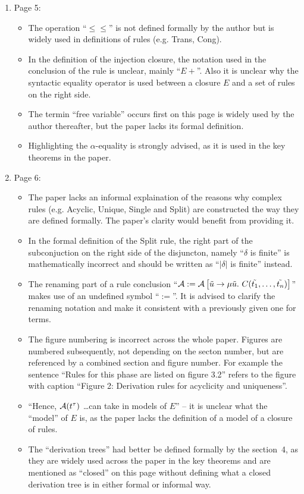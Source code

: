 \begin{enumerate}
	\item Page 5:
	\begin{itemize}
		\item The operation ``$\le\le$'' is not defined formally by the author but is widely used in definitions of rules (e.g. Trans, Cong).
		\item In the definition of the injection closure, the notation used in the conclusion of the rule is unclear, mainly ``$E+$''. Also it is unclear why the syntactic equality operator is used between a closure $E$ and a set of rules on the right side.
		\item The termin ``free variable'' occurs first on this page is widely used by the author thereafter, but the paper lacks its formal definition.
		\item Highlighting the $\alpha$-equality is strongly advised, as it is used in the key theorems in the paper.
	\end{itemize}

	\item Page 6:
	\begin{itemize}
		\item The paper lacks an informal explaination of the reasons why complex rules (e.g. Acyclic, Unique, Single and Split) are constructed the way they are defined formally. The paper's clarity would benefit from providing it.
		\item In the formal definition of the Split rule, the right part of the subconjuction on the right side of the disjuncton, namely ``$\delta$ is finite'' is mathematically incorrect and should be written as ``$|\delta|$ is finite'' instead.
		\item The renaming part of a rule conclusion ``$\mathcal{A} := \mathcal{A}\left[ \tilde{u} \rightarrow \mu \tilde{u}.\ C(\tilde{t_1},\dots,\tilde{t_n}) \right]$'' makes use of an undefined symbol ``$:=$''. It is advised to clarify the renaming notation and make it consistent with a previously given one for terms.
		\item The figure numbering is incorrect across the whole paper. Figures are numbered subsequently, not depending on the secton number, but are referenced by a combined section and figure number. For example the sentence ``Rules for this phase are listed on figure 3.2'' refers to the figure with caption ``Figure 2: Derivation rules for acyclicity and uniqueness''.
		\item ``Hence, $\mathcal{A}(t^\tau)$ \dots can take in models of $E$'' -- it is unclear what the ``model'' of $E$ is, as the paper lacks the definition of a model of a closure of rules.
		\item The ``derivation trees'' had better be defined formally by the section~4, as they are widely used across the paper in the key theorems and are mentioned as ``closed'' on this page without defining what a closed derivation tree is in either formal or informal way.
	\end{itemize}


\end{enumerate}
